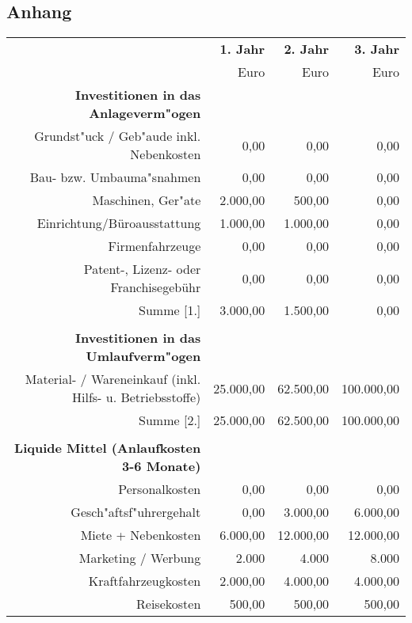 \begin{appendix}
	\section{Anhang}
	\begin{table}
		\begin{tabular}{r|r|r|r|}
				& \textbf{1. Jahr} & \textbf{2. Jahr} & \textbf{3. Jahr} \\ 
												& Euro & Euro & Euro \\ 
		\textbf{Investitionen in das Anlageverm"ogen}	&  &  &  \\ 
		Grundst"uck / Geb"aude inkl. Nebenkosten		& 0,00 & 0,00 & 0,00 \\ 
		Bau- bzw. Umbauma"snahmen					& 0,00 & 0,00 & 0,00 \\ 
		Maschinen, Ger"ate							& 2.000,00 & 500,00 & 0,00 \\ 
		Einrichtung/Büroausstattung & 1.000,00 & 1.000,00 & 0,00 \\ 
		Firmenfahrzeuge		& 0,00 & 0,00 & 0,00 \\ 
		Patent-, Lizenz- oder Franchisegebühr		& 0,00 & 0,00 & 0,00 \\ 
		\hline
		Summe [1.]	& 3.000,00 & 1.500,00 & 0,00 \\ 
		\hline
		&  &  &  \\ 
		\textbf{Investitionen in das Umlaufverm"ogen}		&  &  &  \\ 
		Material- / Wareneinkauf (inkl. Hilfs- u. Betriebsstoffe) & 25.000,00 & 62.500,00 & 100.000,00 \\ 
		\hline
		Summe [2.]	& 25.000,00 & 62.500,00 & 100.000,00 \\ 
		\hline
		&  &  &  \\ 
		\textbf{Liquide Mittel (Anlaufkosten 3-6 Monate)} &  &  &  \\ 
		Personalkosten	& 0,00 & 0,00 & 0,00 \\ 
		Gesch"aftsf"uhrergehalt	& 0,00 & 3.000,00 & 6.000,00 \\ 
		Miete + Nebenkosten	& 6.000,00 & 12.000,00 & 12.000,00 \\ 
		Marketing / Werbung	& 2.000 & 4.000 & 8.000 \\ 
		Kraftfahrzeugkosten	& 2.000,00 & 4.000,00 & 4.000,00 \\ 
		Reisekosten	& 500,00 & 500,00 & 500,00 \\ 

\end{tabular}
\end{table}
\end{appendix}
